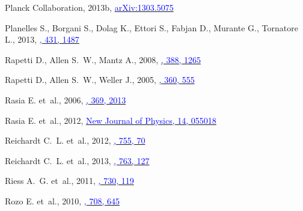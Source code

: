 \documentclass[useAMS,usenatbib,usegraphicx]{mn2e}
\begin{document}
\begin{thebibliography}{}
{Planck Collaboration}, 2013b,
  \href{http://arxiv.org/abs/1303.5075}{\textcolor{blue}{arXiv:1303.5075}}

{Planelles} S., {Borgani} S., {Dolag} K., {Ettori} S., {Fabjan} D., {Murante}
  G.,  {Tornatore} L., 2013,
  \href{http://adsabs.harvard.edu/abs/2013MNRAS.431.1487P}{\textcolor{blue}{\mnras,
  431, 1487}}

{Rapetti} D., {Allen} S.~W.,  {Mantz} A., 2008,
  \href{http://adsabs.harvard.edu/abs/2008MNRAS.388.1265R}{\textcolor{blue}{\mnras,
  388, 1265}}

{Rapetti} D., {Allen} S.~W.,  {Weller} J., 2005,
  \href{http://adsabs.harvard.edu/abs/2005MNRAS.360..555R}{\textcolor{blue}{\mnras,
  360, 555}}

{Rasia} E. et~al., 2006,
  \href{http://adsabs.harvard.edu/abs/2006MNRAS.369.2013R}{\textcolor{blue}{\mnras,
  369, 2013}}

{Rasia} E. et~al., 2012,
  \href{http://adsabs.harvard.edu/abs/2012NJPh...14e5018R}{\textcolor{blue}{New
  Journal of Physics, 14, 055018}}

{Reichardt} C.~L. et~al., 2012,
  \href{http://adsabs.harvard.edu/abs/2012ApJ...755...70R}{\textcolor{blue}{\apj,
  755, 70}}

{Reichardt} C.~L. et~al., 2013,
  \href{http://adsabs.harvard.edu/abs/2013ApJ...763..127R}{\textcolor{blue}{\apj,
  763, 127}}

{Riess} A.~G. et~al., 2011,
  \href{http://adsabs.harvard.edu/abs/2011ApJ...730..119R}{\textcolor{blue}{\apj,
  730, 119}}

{Rozo} E. et~al., 2010,
  \href{http://adsabs.harvard.edu/abs/2010ApJ...708..645R}{\textcolor{blue}{\apj,
  708, 645}}


\end{thebibliography}
\end{document}
